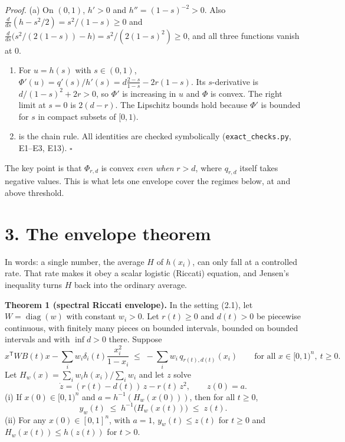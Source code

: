 \documentclass[
  11pt,
  a4paper,
]{article}
\begin{document}
\emph{Proof.} (a) On \((0,1)\), \(h'>0\) and \(h''=(1-s)^{-2}>0\). Also
\(\frac{d}{ds}(h-s^2/2)=s^2/(1-s)\ge0\) and
\(\frac{d}{ds}\big(s^2/(2(1-s))-h\big)=s^2/(2(1-s)^2)\ge0\), and all
three functions vanish at \(0\).

\begin{enumerate}
\def\labelenumi{(\alph{enumi})}
\setcounter{enumi}{1}
\item
  For \(u=h(s)\) with \(s\in(0,1)\),
  \(\Phi'(u)=q'(s)/h'(s)=d\frac{2-s}{1-s}-2r(1-s)\). Its
  \(s\)-derivative is \(d/(1-s)^2+2r>0\), so \(\Phi'\) is increasing in
  \(u\) and \(\Phi\) is convex. The right limit at \(s=0\) is
  \(2(d-r)\). The Lipschitz bounds hold because \(\Phi'\) is bounded for
  \(s\) in compact subsets of \([0,1)\).
\item
  is the chain rule. All identities are checked symbolically
  (\texttt{exact\_checks.py}, E1--E3, E13). \(\square\)
\end{enumerate}

The key point is that \(\Phi_{r,d}\) is convex \emph{even when} \(r>d\),
where \(q_{r,d}\) itself takes negative values. This is what lets one
envelope cover the regimes below, at and above threshold.

\section{3. The envelope theorem}\label{the-envelope-theorem}

In words: a single number, the average \(H\) of \(h(x_i)\), can only
fall at a controlled rate. That rate makes it obey a scalar logistic
(Riccati) equation, and Jensen's inequality turns \(H\) back into the
ordinary average.

\textbf{Theorem 1 (spectral Riccati envelope).} In the setting (2.1),
let \(W=\operatorname{diag}(w)\) with constant \(w_i>0\). Let
\(r(t)\ge0\) and \(d(t)>0\) be piecewise continuous, with finitely many
pieces on bounded intervals, bounded on bounded intervals and with
\(\inf d>0\) there. Suppose \[
x^{\mathsf T}WB(t)x-\sum_iw_i\delta_i(t)\frac{x_i^2}{1-x_i}\;\le\;-\sum_iw_i\,q_{r(t),d(t)}(x_i)\qquad\text{for all }x\in[0,1)^n,\ t\ge0. \tag{D}
\] Let \(H_w(x)=\sum_iw_ih(x_i)/\sum_iw_i\) and let \(z\) solve
\[\dot z=(r(t)-d(t))\,z-r(t)\,z^2,\qquad z(0)=a. \tag{3.1}\] (i) If
\(x(0)\in[0,1)^n\) and \(a=h^{-1}(H_w(x(0)))\), then for all \(t\ge0\),
\[y_w(t)\;\le\;h^{-1}\big(H_w(x(t))\big)\;\le\;z(t). \tag{3.2}\] (ii)
For any \(x(0)\in[0,1]^n\), with \(a=1\), \(y_w(t)\le z(t)\) for
\(t\ge0\) and \(H_w(x(t))\le h(z(t))\) for \(t>0\).
\end{document}
